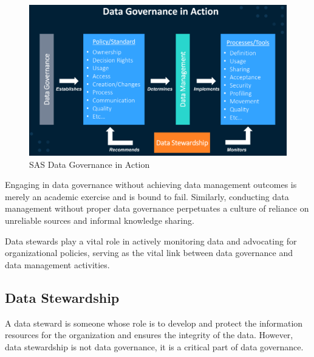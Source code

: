 \begin{figure}[H]
    \centering
    \includegraphics[scale=.60]{images/SAS Data Governance In Action.png}
    \caption{SAS Data Governance in Action}
    \label{SAS DGIA}
\end{figure}

Engaging in data governance without achieving data management outcomes is merely an academic exercise and is bound to fail. Similarly, conducting data management without proper data governance perpetuates a culture of reliance on unreliable sources and informal knowledge sharing. 

Data stewards play a vital role in actively monitoring data and advocating for organizational policies, serving as the vital link between data governance and data management activities.

\subsection{Data Stewardship}
A data steward is someone whose role is to develop and protect the information resources for the organization and ensures the integrity of the data. However, data stewardship is not data governance, it is a critical part of data governance. 

